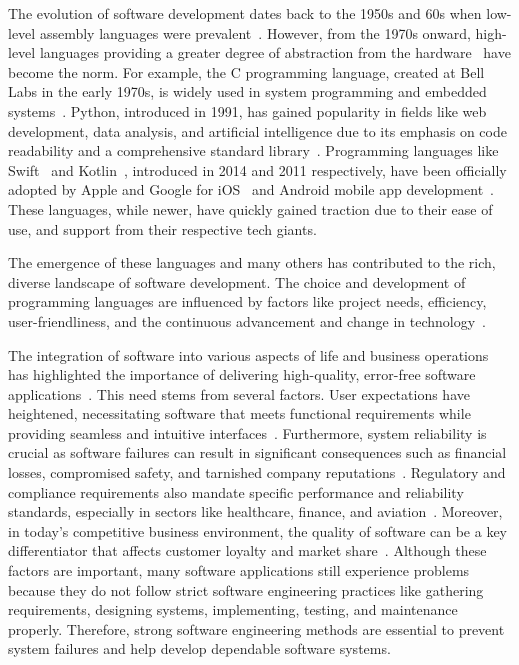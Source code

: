 The evolution of software development dates back to the 1950s and 60s when low-level assembly
languages were prevalent~\cite{lehman2002software}. However, from the 1970s onward, high-level
languages providing a greater degree of abstraction from the hardware~\cite{WhatisHa66:online}
have become the norm. For example, the C programming language, created at Bell
Labs in the early 1970s, is widely used in system programming and embedded
systems~\cite{kernighan2002c}.
Python, introduced in 1991, has gained popularity in fields like web development,
data analysis, and artificial intelligence due to its emphasis on code readability and a
comprehensive standard library~\cite{van2007python}. Programming languages like
Swift~\cite{rebouccas2016empirical} and Kotlin~\cite{samuel2017programming},
introduced in 2014 and 2011 respectively, have been officially adopted by Apple and Google
for iOS~\cite{WhatIsSw25:online} and Android mobile app development~\cite{WhatIsKo37:online}.
These languages, while newer, have quickly gained traction due to their ease of use,
and support from their respective tech giants.

The emergence of these languages and many others has contributed to the rich,
diverse landscape of software development. The choice and development of
programming languages are influenced by factors like project needs, efficiency,
user-friendliness, and the continuous advancement and change in technology~\cite{goosen2008brief}.

The integration of software into various aspects of life and business operations
has highlighted the importance of delivering high-quality, error-free software
applications~\cite{kahn2002information}. This need stems from several factors.
User expectations have heightened, necessitating software that meets functional
requirements while providing seamless and intuitive interfaces~\cite{ryker1997determinants}.
Furthermore, system reliability is crucial as software failures can result in significant
consequences such as financial losses, compromised safety, and
tarnished company reputations~\cite{pham2007system}.
Regulatory and compliance requirements also mandate specific performance and reliability standards,
especially in sectors like healthcare, finance, and aviation~\cite{mishra2022cybersecurity}. Moreover,
in today's competitive business environment, the quality of software can be a key differentiator
that affects customer loyalty and market share~\cite{rust1993customer}. Although
these factors are important, many software applications still experience
problems because they do not follow strict software engineering practices like
gathering requirements, designing systems, implementing, testing, and
maintenance properly. Therefore, strong software engineering methods are
essential to prevent system failures and help develop dependable software
systems.

